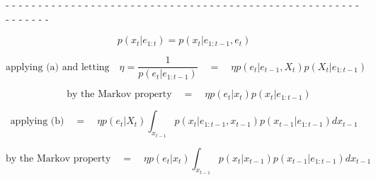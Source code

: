 \begin{center}
- - - - - - - - - - - - - - - - - - - - - - - - - - - - - - - - - - - - - - - - - - - - - - - - - - - - - - - - - - - - - 
\end{center}

\[p(x_t | e_{1:t}) = p(x_t | e_{1:t-1}, e_t) \]

\[\text{applying (a) and letting} \quad \eta = \frac{1}{p(e_t | e_{1:t-1})} \quad= \quad \eta p(e_t | e_{t-1}, X_t)p(X_t|e_{1:t-1})\]

\[\quad \text{by the Markov property} \quad = \quad \eta p(e_t | x_t)p(x_t|e_{1:t-1})\]

\[\text{applying (b)} \quad =  \quad \eta p(e_t | X_t)\int_{x_{t-1}}p(x_t|e_{1:t-1}, x_{t-1}) p(x_{t-1}|e_{1:t-1})dx_{t-1}\]

\[\text{by the Markov property} \quad = \quad \eta p(e_t | x_t)\int_{x_{t-1}}p(x_t|x_{t-1}) p(x_{t-1}|e_{1:t-1})dx_{t-1}\]

